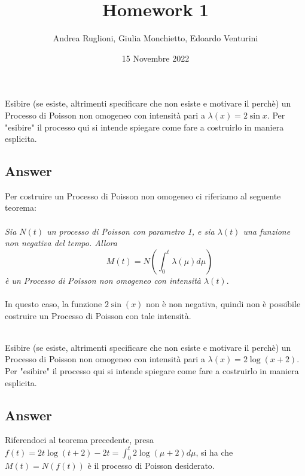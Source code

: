 \documentclass[
	12pt, %
]{fphw}
\title{Homework 1} %
\author{Andrea Ruglioni, Giulia Monchietto, Edoardo Venturini} %
\date{15 Novembre 2022} %
\institute{Politecnico di Torino} %
\begin{document}
\maketitle %

\begin{problem}
	\smallskip
	Esibire (se esiste, altrimenti specificare che non esiste e motivare il perchè)
	un Processo di Poisson non omogeneo con intensità pari a $\lambda(x) = 2\sin x$. Per "esibire" il processo qui si intende spiegare come fare
	a costruirlo in maniera esplicita.
	\smallskip
\end{problem}
\subsection*{Answer}
	Per costruire un Processo di Poisson non omogeneo ci riferiamo al seguente teorema:\\
	\\
	\null\quad \textit{Sia $N(t)$ un processo di Poisson con parametro 1, e sia $\lambda(t)$ una funzione\\
	\null\quad non negativa del tempo. Allora
	\begin{equation*}
		\quad M(t) = N(\int_0^t \lambda(\mu)d\mu)
	\end{equation*}
	\null\quad è un Processo di Poisson non omogeneo con intensità $\lambda(t)$}.\\
	\\
	In questo caso, la funzione $2\sin(x)$ non è non negativa, quindi non è possibile costruire un Processo di Poisson con tale intensità.\\
	\\

\begin{problem}
	\smallskip
	Esibire (se esiste, altrimenti specificare che non esiste e motivare il perchè)
	un Processo di Poisson non omogeneo con intensità pari a $\lambda(x) = 2\log (x+2)$. Per "esibire" il processo qui si intende spiegare come fare
	a costruirlo in maniera esplicita.
	\smallskip
\end{problem}
\subsection*{Answer}
	Riferendoci al teorema precedente, presa $f(t) = 2t\log(t+2) - 2t = \int_0^t 2\log(\mu + 2)d\mu$, 
	si ha che $M(t) = N(f(t))$ è il processo di Poisson desiderato.
\end{document}
